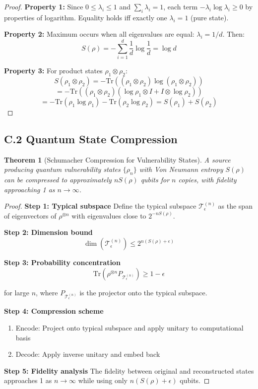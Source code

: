 \documentclass[journal]{IEEEtran}
\newtheorem{theorem}{Theorem}
\begin{document}
\begin{proof}
\textbf{Property 1:} Since $0 \leq \lambda_i \leq 1$ and $\sum_i \lambda_i = 1$, each term $-\lambda_i \log \lambda_i \geq 0$ by properties of logarithm. Equality holds iff exactly one $\lambda_i = 1$ (pure state).

\textbf{Property 2:} Maximum occurs when all eigenvalues are equal: $\lambda_i = 1/d$. Then:
$$S(\rho) = -\sum_{i=1}^d \frac{1}{d} \log \frac{1}{d} = \log d$$

\textbf{Property 3:} For product states $\rho_1 \otimes \rho_2$:
$$S(\rho_1 \otimes \rho_2) = -\text{Tr}((\rho_1 \otimes \rho_2) \log(\rho_1 \otimes \rho_2))$$
$$= -\text{Tr}((\rho_1 \otimes \rho_2)(\log \rho_1 \otimes I + I \otimes \log \rho_2))$$
$$= -\text{Tr}(\rho_1 \log \rho_1) - \text{Tr}(\rho_2 \log \rho_2) = S(\rho_1) + S(\rho_2)$$
\end{proof}

\subsection{C.2 Quantum State Compression}

\begin{theorem}[Schumacher Compression for Vulnerability States]
A source producing quantum vulnerability states $\{\rho_n\}$ with Von Neumann entropy $S(\rho)$ can be compressed to approximately $nS(\rho)$ qubits for $n$ copies, with fidelity approaching 1 as $n \to \infty$.
\end{theorem}

\begin{proof}
\textbf{Step 1: Typical subspace}
Define the typical subspace $\mathcal{T}_\epsilon^{(n)}$ as the span of eigenvectors of $\rho^{\otimes n}$ with eigenvalues close to $2^{-nS(\rho)}$.

\textbf{Step 2: Dimension bound}
$$\dim(\mathcal{T}_\epsilon^{(n)}) \leq 2^{n(S(\rho) + \epsilon)}$$

\textbf{Step 3: Probability concentration}
$$\text{Tr}(\rho^{\otimes n} P_{\mathcal{T}_\epsilon^{(n)}}) \geq 1 - \epsilon$$

for large $n$, where $P_{\mathcal{T}_\epsilon^{(n)}}$ is the projector onto the typical subspace.

\textbf{Step 4: Compression scheme}
\begin{enumerate}
\item Encode: Project onto typical subspace and apply unitary to computational basis
\item Decode: Apply inverse unitary and embed back
\end{enumerate}

\textbf{Step 5: Fidelity analysis}
The fidelity between original and reconstructed states approaches 1 as $n \to \infty$ while using only $n(S(\rho) + \epsilon)$ qubits.
\end{proof}
\end{document}
